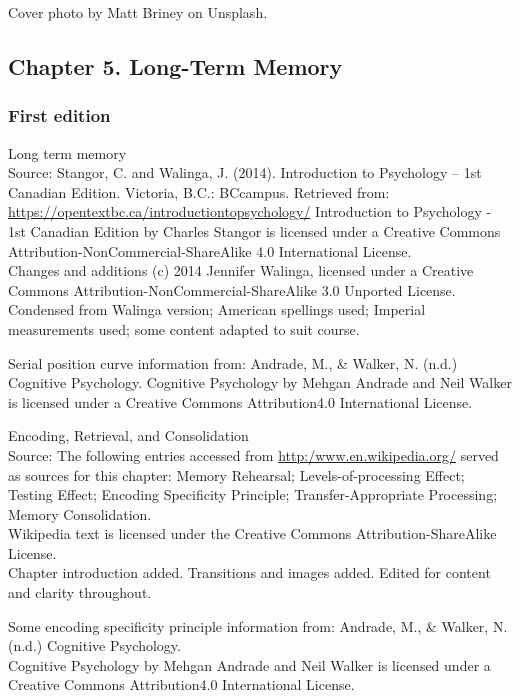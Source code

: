 \documentclass[
]{krantz}
\begin{document}
Cover photo by Matt Briney on Unsplash.

\hypertarget{chapter-5.-long-term-memory}{%
\subsection*{Chapter 5. Long-Term Memory}\label{chapter-5.-long-term-memory}}


\hypertarget{first-edition-5}{%
\subsubsection*{First edition}\label{first-edition-5}}


Long term memory\\
Source: Stangor, C. and Walinga, J. (2014). Introduction to Psychology -- 1st Canadian Edition. Victoria, B.C.: BCcampus. Retrieved from: \url{https://opentextbc.ca/introductiontopsychology/}
Introduction to Psychology - 1st Canadian Edition by Charles Stangor is licensed under a Creative Commons Attribution-NonCommercial-ShareAlike 4.0 International License.\\
Changes and additions (c) 2014 Jennifer Walinga, licensed under a Creative Commons Attribution-NonCommercial-ShareAlike 3.0 Unported License.\\
Condensed from Walinga version; American spellings used; Imperial measurements used; some content adapted to suit course.

Serial position curve information from: Andrade, M., \& Walker, N. (n.d.) Cognitive Psychology.
Cognitive Psychology by Mehgan Andrade and Neil Walker is licensed under a Creative Commons Attribution4.0 International License.

Encoding, Retrieval, and Consolidation\\
Source: The following entries accessed from \url{http:/www.en.wikipedia.org/} served as sources for this chapter: Memory Rehearsal; Levels-of-processing Effect; Testing Effect; Encoding Specificity Principle; Transfer-Appropriate Processing; Memory Consolidation.\\
Wikipedia text is licensed under the Creative Commons Attribution-ShareAlike License.\\
Chapter introduction added. Transitions and images added. Edited for content and clarity throughout.

Some encoding specificity principle information from: Andrade, M., \& Walker, N. (n.d.) Cognitive Psychology.\\
Cognitive Psychology by Mehgan Andrade and Neil Walker is licensed under a Creative Commons Attribution4.0 International License.\\
\end{document}
